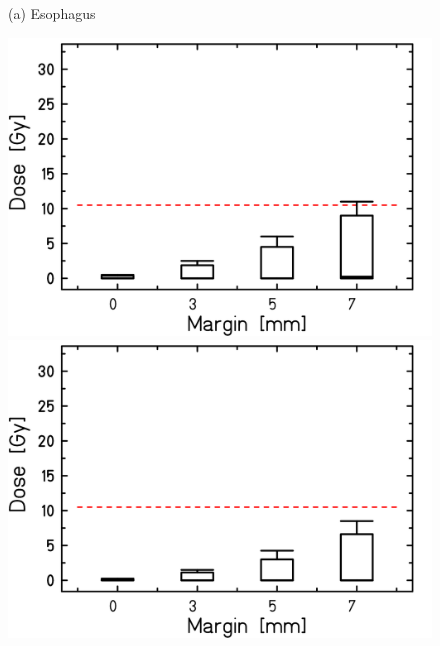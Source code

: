\begin{figure}[H]
\begin{minipage}{0.31\textwidth}
\end{minipage}
\hfill
\vspace*{0.1cm}
\begin{minipage}{\textwidth}
 \hspace*{7.5cm} (a) Esophagus \\
\end{minipage}
\hfill
\begin{minipage}{0.31\textwidth}
  \includegraphics[width=\textwidth]{./teile/results_human/Whisker_TRACHEA_ITV.png}
\end{minipage}
\hfill
\begin{minipage}{0.31\textwidth}
  \includegraphics[width=\textwidth]{./teile/results_human/Whisker_TRACHEA_IMPT_woOverlap.png}
\end{minipage}
\hfill
\begin{minipage}{0.31\textwidth}

\end{minipage}
\end{figure}
